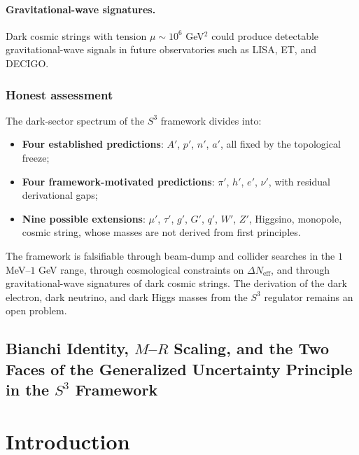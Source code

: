 \documentclass[a4paper,1pt,oneside,openany]{book}
\begin{document}
\paragraph{Gravitational-wave signatures.}
Dark cosmic strings with tension $\mu\sim 10^{6}$ GeV$^{2}$ could 
produce detectable gravitational-wave signals in future 
observatories such as LISA, ET, and DECIGO.

\subsubsection{Honest assessment}

The dark-sector spectrum of the $S^{3}$ framework divides into:
\begin{itemize}
\item \textbf{Four established predictions}: $A'$, $p'$, $n'$, 
$a'$, all fixed by the topological freeze;
\item \textbf{Four framework-motivated predictions}: $\pi'$, 
$h'$, $e'$, $\nu'$, with residual derivational gaps;
\item \textbf{Nine possible extensions}: $\mu'$, $\tau'$, $g'$, 
$G'$, $q'$, $W'$, $Z'$, Higgsino, monopole, cosmic string, whose 
masses are not derived from first principles.
\end{itemize}
The framework is falsifiable through beam-dump and collider 
searches in the $1$ MeV--$1$ GeV range, through cosmological 
constraints on $\Delta N_{\text{eff}}$, and through 
gravitational-wave signatures of dark cosmic strings. The 
derivation of the dark electron, dark neutrino, and dark Higgs 
masses from the $S^{3}$ regulator remains an open problem.


\subsection{Bianchi Identity, $M$--$R$ Scaling, and the Two Faces of the Generalized Uncertainty Principle in the $S^{3}$ Framework}


\section{Introduction}
\end{document}
